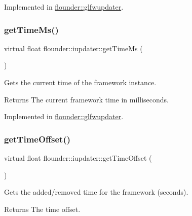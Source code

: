 Implemented in \hyperlink{classflounder_1_1glfwupdater_a284945635b93ffc1bd6164ff20565349}{flounder\+::glfwupdater}.

\mbox{\label{classflounder_1_1iupdater_a6f5a67e27507165d4423b32e29ca3446}} 
\subsubsection{\texorpdfstring{get\+Time\+Ms()}{getTimeMs()}}
{\footnotesize\ttfamily virtual float flounder\+::iupdater\+::get\+Time\+Ms (\begin{DoxyParamCaption}{ }\end{DoxyParamCaption})\hspace{0.3cm}{\ttfamily [pure virtual]}}



Gets the current time of the framework instance. 

\begin{DoxyReturn}{Returns}
The current framework time in milliseconds. 
\end{DoxyReturn}


Implemented in \hyperlink{classflounder_1_1glfwupdater_ac27f7a962d72e4dff8e13db7d84647ba}{flounder\+::glfwupdater}.

\mbox{\label{classflounder_1_1iupdater_a4e682002890f952dee48c646fce39824}} 
\subsubsection{\texorpdfstring{get\+Time\+Offset()}{getTimeOffset()}}
{\footnotesize\ttfamily virtual float flounder\+::iupdater\+::get\+Time\+Offset (\begin{DoxyParamCaption}{ }\end{DoxyParamCaption})\hspace{0.3cm}{\ttfamily [pure virtual]}}



Gets the added/removed time for the framework (seconds). 

\begin{DoxyReturn}{Returns}
The time offset. 
\end{DoxyReturn}


